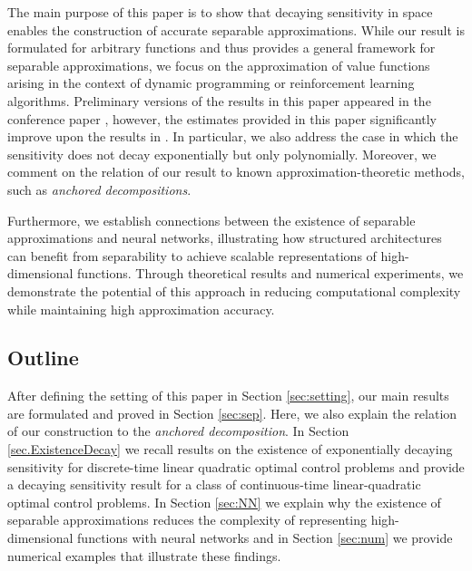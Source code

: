 \documentclass{article}
\begin{document}
The main purpose of this paper is to show that decaying sensitivity in space enables the construction of accurate separable approximations. While our result is formulated for arbitrary functions and thus provides a general framework for separable approximations, we focus on the approximation of value functions arising in the context of dynamic programming or reinforcement learning algorithms. Preliminary versions of the results in this paper appeared in the conference paper \cite{sperl2023separable}, however, the estimates provided in this paper significantly improve upon the results in \cite{sperl2023separable}. In particular, we also address the case in which the sensitivity does not decay exponentially but only polynomially. Moreover, we comment on the relation of our result to known approximation-theoretic methods, such as {\sl anchored decompositions}.

Furthermore, we establish connections between the existence of separable approximations and neural networks, illustrating how structured architectures can benefit from separability to achieve scalable representations of high-dimensional functions. Through theoretical results and numerical experiments, we demonstrate the potential of this approach in reducing computational complexity while maintaining high approximation accuracy.

\subsection{Outline}

After defining the setting of this paper in Section \ref{sec:setting}, our main results are formulated and proved in Section \ref{sec:sep}. Here, we also explain the relation of our construction to the \emph{anchored decomposition}. In Section \ref{sec.ExistenceDecay} we recall results on the existence of exponentially decaying sensitivity for discrete-time linear quadratic optimal control problems and provide a decaying sensitivity result for a class of continuous-time linear-quadratic optimal control problems. In Section \ref{sec:NN} we explain why the existence of separable approximations reduces the complexity of representing high-dimensional functions with neural networks and in Section \ref{sec:num} we provide numerical examples that illustrate these findings.
\end{document}
